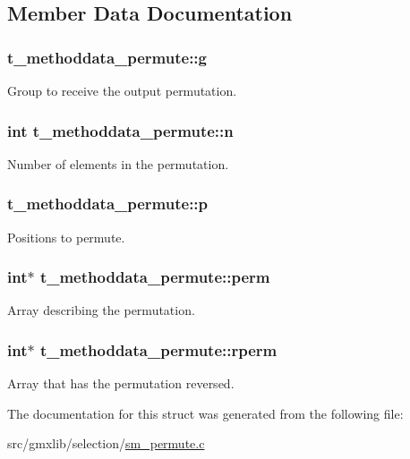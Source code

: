 \subsection{\-Member \-Data \-Documentation}
\hypertarget{structt__methoddata__permute_aeba736ef4f24f7d8ef19fa21f26896df}{
\subsubsection[{g}]{ {\bf t\-\_\-methoddata\-\_\-permute\-::g}}}\label{structt__methoddata__permute_aeba736ef4f24f7d8ef19fa21f26896df}
\-Group to receive the output permutation. \hypertarget{structt__methoddata__permute_a7e83f587742bc6bd355eda1f2629afb1}{
\subsubsection[{n}]{\setlength{\rightskip}{0pt plus 5cm}int {\bf t\-\_\-methoddata\-\_\-permute\-::n}}}\label{structt__methoddata__permute_a7e83f587742bc6bd355eda1f2629afb1}
\-Number of elements in the permutation. \hypertarget{structt__methoddata__permute_a624b396a8a80e4058f2deca10a45975d}{
\subsubsection[{p}]{ {\bf t\-\_\-methoddata\-\_\-permute\-::p}}}\label{structt__methoddata__permute_a624b396a8a80e4058f2deca10a45975d}
\-Positions to permute. \hypertarget{structt__methoddata__permute_ab283a79dfc6bc97da65ba402da12fd88}{
\subsubsection[{perm}]{\setlength{\rightskip}{0pt plus 5cm}int$\ast$ {\bf t\-\_\-methoddata\-\_\-permute\-::perm}}}\label{structt__methoddata__permute_ab283a79dfc6bc97da65ba402da12fd88}
\-Array describing the permutation. \hypertarget{structt__methoddata__permute_a061b45cffc8dc049e853385123db22e8}{
\subsubsection[{rperm}]{\setlength{\rightskip}{0pt plus 5cm}int$\ast$ {\bf t\-\_\-methoddata\-\_\-permute\-::rperm}}}\label{structt__methoddata__permute_a061b45cffc8dc049e853385123db22e8}
\-Array that has the permutation reversed. 

\-The documentation for this struct was generated from the following file\-:\begin{DoxyCompactItemize}
\item 
src/gmxlib/selection/\hyperlink{sm__permute_8c}{sm\-\_\-permute.\-c}\end{DoxyCompactItemize}
